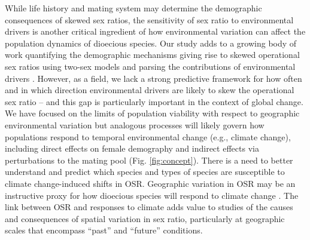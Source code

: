 \documentclass[11pt]{article}\usepackage[]{graphicx}\usepackage[]{color}
\begin{document}
While life history and mating system may determine the demographic consequences of skewed sex ratios, the sensitivity of sex ratio to environmental drivers is another critical ingredient of how environmental variation can affect the population dynamics of dioecious species.
Our study adds to a growing body of work quantifying the demographic mechanisms giving rise to skewed operational sex ratios using two-sex models \citep{eberhart2017sex,veran2009demographic,shelton2010origin} and parsing the contributions of environmental drivers \citep{bialic2020deer}.
However, as a field, we lack a strong predictive framework for how often and in which direction environmental drivers are likely to skew the operational sex ratio -- and this gap is particularly important in the context of global change. 
We have focused on the limits of population viability with respect to geographic environmental variation but analogous processes will likely govern how populations respond to temporal environmental change (e.g., climate change), including direct effects on female demography and indirect effects via perturbations to the mating pool (Fig. \ref{fig:concept}). 
There is a need to better understand and predict which species and types of species are susceptible to climate change-induced shifts in OSR.
Geographic variation in OSR may be an instructive proxy for how dioecious species will respond to climate change \citep{petry2016sex}. 
The link between OSR and responses to climate adds value to studies of the causes and consequences of spatial variation in sex ratio, particularly at geographic scales that encompass ``past'' and ``future'' conditions. 
\end{document}
